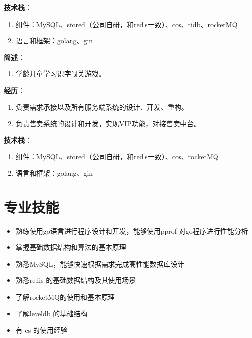 \documentclass{resume}
\begin{document}
\textbf{技术栈}：
\begin{enumerate}[parsep=0.5ex]
  \item 组件：MySQL、stored（公司自研，和redis一致）、cos、tidb、rocketMQ
  \item 语言和框架：golang、gin
\end{enumerate}

\textbf{简述}：
\begin{enumerate}[parsep=0.5ex]
  \item 学龄儿童学习识字闯关游戏。
\end{enumerate}

\textbf{经历}：
\begin{enumerate}[parsep=0.5ex]
  \item 负责需求承接以及所有服务端系统的设计、开发、重构。
  \item 负责售卖系统的设计和开发，实现VIP功能，对接售卖中台。
\end{enumerate}

\textbf{技术栈}：
\begin{enumerate}[parsep=0.5ex]
  \item 组件：MySQL、stored（公司自研，和redis一致）、cos、rocketMQ
  \item 语言和框架：golang、gin
\end{enumerate}

\section{专业技能}

\begin{itemize}[parsep=0.5ex]
  \item 熟练使用go语言进行程序设计和开发，能够使用pprof 对go程序进行性能分析
  \item 掌握基础数据结构和算法的基本原理
  \item 熟悉MySQL，能够快速根据需求完成高性能数据库设计
  \item 熟悉redis 的基础数据结构及其使用场景
  \item 了解rocketMQ的使用和基本原理
  \item 了解leveldb 的基础结构
  \item 有 es 的使用经验
\end{itemize}
\end{document}
